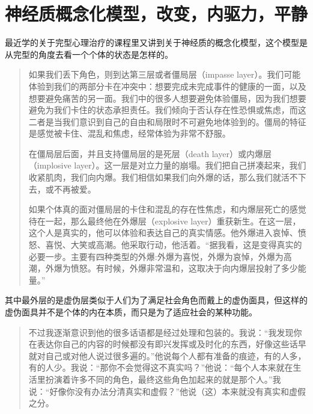 \chapter{神经质概念化模型，改变，内驱力，平静}




\begin{figure}
\end{figure}

最近学的关于完型心理治疗的课程里又讲到关于神经质的概念化模型，这个模型是从完型的角度去看一个个体的状态是怎样的。

\blockquote{
	如果我们丢下角色，则到达第三层或者僵局层（impasse layer）。我们可能体验到我们的两部分卡在冲突中：想要完成未完成事件的健康的一面，以及想要避免痛苦的另一面。我们中的很多人想要避免体验僵局，因为我们想要避免为我们卡住的状态承担责任。我们倾向于否认存在性恐惧或焦虑，而这二者是当我们意识到自己的自由和局限时不可避免地体验到的。僵局的特征是感觉被卡住、混乱和焦虑，经常体验为非常不舒服。

	在僵局层后面，并且支持僵局层的是死层（death layer）或内爆层（implosive layer）。这一层是对立力量的崩塌。我们把自己拼凑起来，我们收紧肌肉，我们向内爆。我们相信如果我们向外爆的话，那么我们就活不下去，或不再被爱。

	如果个体真的面对僵局层的卡住和混乱的存在性焦虑，和内爆层死亡的感觉待在一起，那么最终他在外爆层（explosive layer）重获新生。在这一层，这个人是真实的，他可以体验和表达自己的真实情感。他外爆进入哀悼、愤怒、喜悦、大笑或高潮。他采取行动，他活着。“据我看，这是变得真实的必要一步。主要有四种类型的外爆:外爆为喜悦，外爆为哀悼，外爆为高潮，外爆为愤怒。有时候，外爆非常温和，这取决于向内爆层投射了多少能量。”

}

其中最外层的是虚伪层\pozhehao{}类似于人们为了满足社会角色而戴上的虚伪面具，但这样的虚伪面具并不是个体的内在本质，而只是为了适应社会的某种功能。

\blockquote{
	不过我逐渐意识到他的很多话语都是经过处理和包装的。我说：“我发现你在表达你自己的内容的时候都没有即兴发挥或及时化的东西，好像这些话早就对自己或对他人说过很多遍的。”他说每个人都有准备的痕迹，有的人多，有的人少。我说：“那你不会觉得这不真实吗？”他说：“每个人本来就在生活里扮演着许多不同的角色，最终这些角色加起来的就是那个人。”我说：“好像你没有办法分清真实和虚假？”他说（这）本来就没有真实和虚假之分。

}

